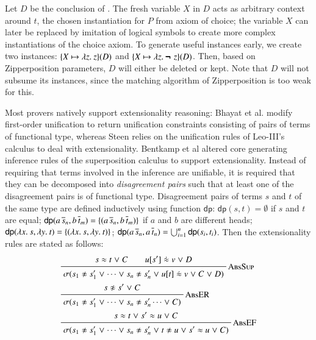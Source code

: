 Let $D$ be the conclusion of . The fresh variable $X$ in $D$ acts as
arbitrary context around $t$, the chosen instantiation for $P$ from axiom of choice;
the variable $X$ can later be replaced by imitation of logical symbols to create more
complex instantiations of the choice axiom. To generate useful instances early, we create two instances: $\{X
\mapsto \lambda z.\> z\}(D)$ and $\{X \mapsto \lambda z.\> \pmb{\neg\,}\, z\}(D)$. Then, based on
Zipperposition parameters, $D$ will either be deleted or kept. Note that $D$
will not subsume its instances, since the matching algorithm of Zipperposition is
too weak for this.

Most provers natively support extensionality reasoning: Bhayat et al. \cite{br-20-full-sup-w-combs} modify
first-order unification to return unification constraints consisting of pairs of
terms of functional type, whereas Steen relies on the unification rules of
Leo-III's calculus \cite[Section 4.3.3.]{as-18-phd} to deal with extensionality.
Bentkamp et al \cite{bbtvw-21-sup-lam} altered core generating inference rules of the superposition calculus
to support extensionality. Instead of requiring that terms
involved in the inference are unifiable, it is required that they can be
decomposed into \emph{disagreement pairs} such that at least one of the
disagreement pairs is of functional type. Disagreement pairs of terms $s$ and
$t$ of the same type are defined inductively using function $\textsf{dp}$:
$\textsf{dp}(s,t) = \emptyset$ if $s$ and $t$ are equal; $\textsf{dp}(a \,
\overline{s}_{n}, b \, \overline{t}_{m}) = \{(a \,
\overline{s}_{n}, b \, \overline{t}_{m})\}$ if $a$ and $b$ are different heads;
$\textsf{dp}(\lambda x.\> s, \lambda y.\> t) = \{ (\lambda x.\> s, \lambda y.\> t) \}$;
$\textsf{dp}(a \, \overline{s}_{n}, a \, \overline{t}_{n}) = \bigcup_{i=1}^{n}
\textsf{dp}(s_i, t_i)$. Then the extensionality rules are stated as follows:
\begin{align*}
  & \namedinference{AbsSup}
  {s \eq t \llor C \qquad u[s'] \mathrel{\dot{\eq}} v \llor D}
  {\sigmacl{s_1 \noteq s'_1 \llor \cdots \llor s_n \noteq s'_n \llor  u[t] \mathrel{\dot{\eq}} v \llor C \llor D}} \\
  &\namedinference{AbsER}{s \noteq s' \llor C}{\sigmacl{s_1 \noteq s'_1 \llor \cdots \llor s_n \noteq s'_n \cdots \llor  C}} \\
  &\namedinference{AbsEF}{s \eq t \llor  s' \eq u \llor C}{\sigmacl{s_1 \noteq s'_1 \llor \cdots \llor s_n \noteq s'_n \llor t \noteq u \llor  s' \eq u \llor C}}
\end{align*}

